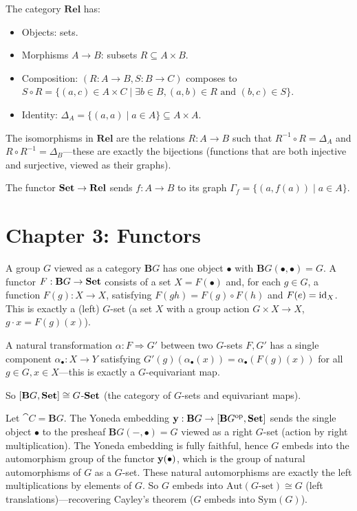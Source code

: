 \begin{exercise}
The category $\mathbf{Rel}$ has:
\begin{itemize}
  \item Objects: sets.
  \item Morphisms $A \to B$: subsets $R \subseteq A \times B$.
  \item Composition: $(R: A \to B, S: B \to C)$ composes to $S \circ R = \{(a,c) \in A \times C \mid \exists b \in B, (a,b) \in R \text{ and } (b,c) \in S\}$.
  \item Identity: $\Delta_A = \{(a,a) \mid a \in A\} \subseteq A \times A$.
\end{itemize}
The isomorphisms in $\mathbf{Rel}$ are the relations $R: A \to B$ such that $R^{-1} \circ R = \Delta_A$ and $R \circ R^{-1} = \Delta_B$—these are exactly the bijections (functions that are both injective and surjective, viewed as their graphs).

The functor $\mathbf{Set} \to \mathbf{Rel}$ sends $f: A \to B$ to its graph $\Gamma_f = \{(a, f(a)) \mid a \in A\}$.
\end{exercise}

\section*{Chapter 3: Functors}

\begin{exercise}
A group $G$ viewed as a category $\mathbf{B}G$ has one object $\bullet$ with $\mathbf{B}G(\bullet,\bullet) = G$. A functor $F: \mathbf{B}G \to \mathbf{Set}$ consists of a set $X = F(\bullet)$ and, for each $g \in G$, a function $F(g): X \to X$, satisfying $F(gh) = F(g) \circ F(h)$ and $F(e) = \mathrm{id}_X$. This is exactly a (left) $G$-set (a set $X$ with a group action $G \times X \to X$, $g \cdot x = F(g)(x)$).

A natural transformation $\alpha: F \Rightarrow G'$ between two $G$-sets $F, G'$ has a single component $\alpha_\bullet: X \to Y$ satisfying $G'(g)(\alpha_\bullet(x)) = \alpha_\bullet(F(g)(x))$ for all $g \in G, x \in X$—this is exactly a $G$-equivariant map.

So $[\mathbf{B}G, \mathbf{Set}] \cong G$-$\mathbf{Set}$ (the category of $G$-sets and equivariant maps).
\end{exercise}

\begin{exercise}
Let $\cat{C} = \mathbf{B}G$. The Yoneda embedding $\mathbf{y}: \mathbf{B}G \to [\mathbf{B}G^{\mathrm{op}}, \mathbf{Set}]$ sends the single object $\bullet$ to the presheaf $\mathbf{B}G(-,\bullet) = G$ viewed as a right $G$-set (action by right multiplication). The Yoneda embedding is fully faithful, hence $G$ embeds into the automorphism group of the functor $\mathbf{y}(\bullet)$, which is the group of natural automorphisms of $G$ as a $G$-set. These natural automorphisms are exactly the left multiplications by elements of $G$. So $G$ embeds into $\mathrm{Aut}(G\text{-set}) \cong G$ (left translations)—recovering Cayley's theorem ($G$ embeds into $\mathrm{Sym}(G)$).
\end{exercise}

